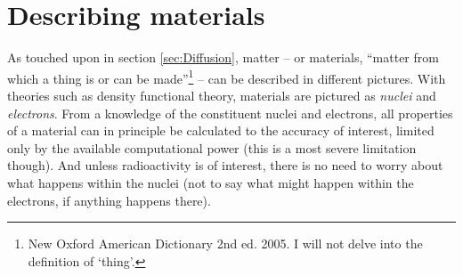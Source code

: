 \documentclass[11pt,bibliography=totoc,index=totoc]{scrbook}   %
\begin{document}


%
\section{Describing materials}\label{sec:materials}
%


As touched upon in section \ref{sec:Diffusion}, matter – or materials, ``matter from which a thing is or can be made''\footnote{New Oxford American Dictionary 2nd ed. 2005. I will not delve into the definition of `thing'.} – can be described in different pictures. 
With theories such as density functional theory, materials are pictured as \emph{nuclei} and \emph{electrons}. %
From a knowledge of the constituent nuclei and electrons, all properties of a material can in principle be calculated to the accuracy of interest, limited only by the available computational power (this is a most severe limitation though).
And unless radioactivity is of interest, there is no need to worry about what happens within the nuclei (not to say what might happen within the electrons, if anything happens there).

\end{document}

